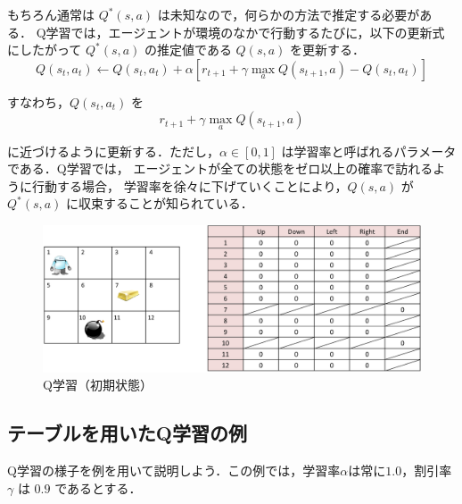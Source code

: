 もちろん通常は $Q^*(s,a)$ は未知なので，何らかの方法で推定する必要がある．
Q学習では，エージェントが環境のなかで行動するたびに，以下の更新式にしたがって
 $Q^*(s,a)$ の推定値である $Q(s,a)$ を更新する．
\begin{equation}
Q(s_t, a_t) \leftarrow Q(s_t, a_t) + \alpha [ r_{t+1} + \gamma \max_a Q(s_{t+1},a) - Q(s_t, a_t) ]
\end{equation}

%
%

すなわち，$Q(s_t, a_t)$ を
\begin{equation}
r_{t+1} + \gamma \max_a Q(s_{t+1},a)
\end{equation}

\noindent
に近づけるように更新する．ただし，$\alpha \in [0,1]$ は学習率と呼ばれるパラメータである．Q学習では，
エージェントが全ての状態をゼロ以上の確率で訪れるように行動する場合，
学習率を徐々に下げていくことにより，$Q(s,a)$ が $Q^*(s,a)$ に収束することが知られている．


\begin{figure}[t]
 \begin{center}
  \includegraphics[width=140mm]{images/TsuruokaLab/ql1.eps}
 \end{center}
 \caption{Q学習（初期状態）}
 \label{fig:ql1}
\end{figure}

\subsection{テーブルを用いたQ学習の例}

Q学習の様子を例を用いて説明しよう．この例では，学習率$\alpha$は常に$1.0$，割引率$\gamma$ は $0.9$ 
であるとする．

